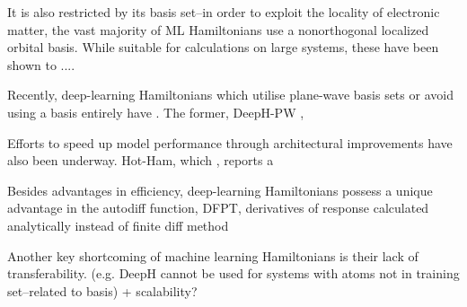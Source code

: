 \documentclass[11pt,a4paper,twoside]{report}  %
\numberwithin{equation}{section}					%
\numberwithin{figure}{section}						%
\newcommand{\red}[1]{{\color{red}#1}}
\begin{document}
It is also restricted by its basis set--in order to exploit the locality of electronic matter, the vast majority of ML Hamiltonians use a nonorthogonal localized orbital basis. While suitable for calculations on large systems, these have been shown to ....

Recently, deep-learning Hamiltonians which utilise plane-wave basis sets or avoid using a basis entirely have . The former, DeepH-PW , 

Efforts to speed up model performance through architectural improvements have also been underway. Hot-Ham, which , reports a 



Besides advantages in efficiency, deep-learning Hamiltonians possess a unique advantage in the autodiff function, \red{DFPT, derivatives of response calculated analytically instead of finite diff method}

Another key shortcoming of machine learning Hamiltonians is their lack of transferability. (e.g. DeepH cannot be used for systems with atoms not in training set--related to basis) + scalability? 
\end{document}
